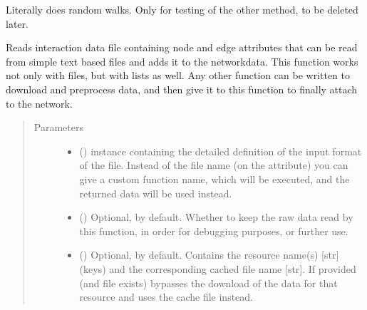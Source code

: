 \documentclass[letterpaper,10pt,english]{sphinxmanual}
\begin{document}
\begin{fulllineitems}
\begin{fulllineitems}
\label{\detokenize{reference:pypath.main.PyPath.random_walk_with_return2}}
Literally does random walks.
Only for testing of the other method, to be deleted later.

\end{fulllineitems}


\begin{fulllineitems}
\label{\detokenize{reference:pypath.main.PyPath.read_data_file}}
Reads interaction data file containing node and edge attributes
that can be read from simple text based files and adds it to the
networkdata. This function works not only with files, but with
lists as well. Any other function can be written to download and
preprocess data, and then give it to this function to finally
attach to the network.
\begin{quote}\begin{description}
\item[{Parameters}] \leavevmode\begin{itemize}
\item {} 
 () \textendash{}  instance
containing the detailed definition of the input format of
the file. Instead of the file name (on the
attribute) you can give a custom function name, which will
be executed, and the returned data will be used instead.

\item {} 
 () \textendash{} Optional,  by default. Whether to keep the raw data
read by this function, in order for debugging purposes, or
further use.

\item {} 
 () \textendash{} Optional, \sphinxcode{\sphinxupquote{\{\}}} by default. Contains the resource name(s)
{[}str{]} (keys) and the corresponding cached file name {[}str{]}.
If provided (and file exists) bypasses the download of the
data for that resource and uses the cache file instead.


\end{itemize}
\end{description}
\end{quote}
\end{fulllineitems}
\end{fulllineitems}
\end{document}
